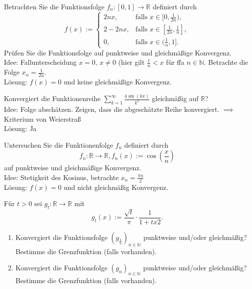 Betrachten Sie die Funktionsfolge $f_n:[0,1] \to \mathbb{R}$ definiert durch
\begin{displaymath}
  f(x) := 
  \begin{cases}
    2nx,& \text{falls } x \in [0,\frac{1}{2n}),\\
    2 - 2nx,& \text{falls } x \in [\frac{1}{2n}, \frac{1}{n}],\\
    0,& \text{falls } x \in (\frac{1}{n}, 1].
  \end{cases}
\end{displaymath}
Prüfen Sie die Funktionsfolge auf punktweise und gleichmäßige Konvergenz.\\
Idee: Fallunterscheidung $x = 0$, $x \neq 0$ (hier gilt $\frac{1}{n} < x$ für ffa $n \in \mathbb{N}$.
Betrachte die Folge $x_n = \frac{1}{2n}$.\\
Lösung: $f(x) = 0$ und keine gleichmäßige Konvergenz.

Konvergiert die Funktionenreihe $\sum_{k = 1}^{\infty} \frac{4 \sin(kx)}{k^2}$ gleichmäßig auf $\mathbb{R}$?\\
Idee: Folge abschätzen. Zeigen, dass die abgeschätzte Reihe konvergiert. $\implies$ Kriterium von Weierstraß\\
Lösung: Ja

Untersuchen Sie die Funktionenfolge $f_n$ definiert durch
\begin{displaymath}
  f_n : \mathbb{R} \to \mathbb{R}, f_n(x) := \cos\left(\frac{x}{n}\right)
\end{displaymath}
auf punktweise und gleichmäßige Konvergenz.\\
Idee: Stetigkeit des Kosinus, betrachte $x_n = \frac{\pi n}{2}$\\
Lösung: $f(x) = 0$ und nicht gleichmäßig Konvergenz.

Für $t > 0$ sei $g_t : \mathbb{R} \to \mathbb{R}$ mit
\begin{displaymath}
  g_t(x) := \frac{\sqrt{t}}{\pi} \cdot \frac{1}{1 + tx2}.
\end{displaymath}
\begin{enumerate}
  \item Konvergiert die Funktionsfolge $\left(g_{\frac{1}{n}}\right)_{n \in \mathbb{N}}$ punktweise und/oder gleichmäßig?
  Bestimme die Grenzfunktion (falls vorhanden).
  \item Konvergiert die Funktionsfolge $\left(g_n\right)_{n \in \mathbb{N}}$ punktweise und/oder gleichmäßig?
  Bestimme die Grenzfunktion (falls vorhanden).
\end{enumerate}


